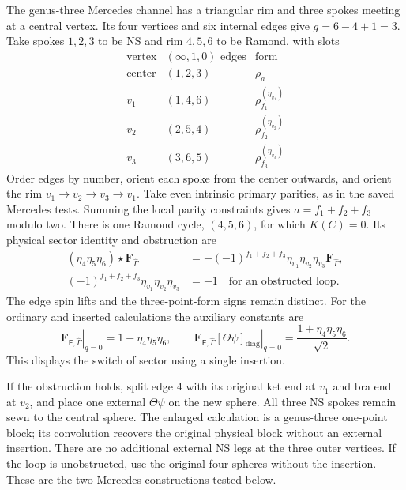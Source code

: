 \documentclass[11pt]{article}
\newcommand{\F}{\mathsf F}
\numberwithin{equation}{section}
\begin{document}
The genus-three Mercedes channel has a triangular rim and three spokes
meeting at a central vertex. Its four vertices and six internal edges
give $g=6-4+1=3$. Take spokes $1,2,3$ to be NS and rim $4,5,6$ to be
Ramond, with slots
\begin{equation}
\begin{array}{c|c|c}
\text{vertex}&(\infty,1,0)\text{ edges}&\text{form}\\ \hline
\text{center}&(1,2,3)&\rho_a\\
v_1&(1,4,6)&\rho_{f_1}^{(\eta_{v_1})}\\
v_2&(2,5,4)&\rho_{f_2}^{(\eta_{v_2})}\\
v_3&(3,6,5)&\rho_{f_3}^{(\eta_{v_3})}
\end{array}
\label{eq:mercedes-vertices}
\end{equation}
Order edges by number, orient each spoke from the center outwards, and
orient the rim $v_1\to v_2\to v_3\to v_1$. Take even intrinsic primary
parities, as in the saved Mercedes tests. Summing the local parity
constraints gives $a=f_1+f_2+f_3$ modulo two.
There is one Ramond cycle, $(4,5,6)$, for which $K(C)=0$. Its physical
sector identity and obstruction are
\begin{align}
 (\eta_4\eta_5\eta_6)\star\mathbf F_{\hat\Gamma}
   &=-(-1)^{f_1+f_2+f_3}\eta_{v_1}\eta_{v_2}\eta_{v_3}
      \mathbf F_{\hat\Gamma},
 \nonumber\\
 (-1)^{f_1+f_2+f_3}\eta_{v_1}\eta_{v_2}\eta_{v_3}&=-1
                           \quad\text{for an obstructed loop}.
 \label{eq:mercedes-obstruction}
\end{align}
The edge spin lifts and the three-point-form signs remain distinct.
For the ordinary and inserted calculations the auxiliary constants are
\begin{equation}
 \left.\mathbf F_{\F,\hat\Gamma}\right|_{q=0}
       =1-\eta_4\eta_5\eta_6,\qquad
 \left.\mathbf F_{\F,\hat\Gamma}[\Theta\psi]_{\mathrm{diag}}
                                   \right|_{q=0}
       =\frac{1+\eta_4\eta_5\eta_6}{\sqrt2}.
 \label{eq:mercedes-ground}
\end{equation}
This displays the switch of sector using a single insertion.

If the obstruction holds, split edge 4 with its original ket end at
$v_1$ and bra end at $v_2$, and place one external $\Theta\psi$ on the
new sphere. All three NS spokes remain sewn to the central sphere.
The enlarged calculation is a genus-three one-point block; its convolution
recovers the original physical block without an external insertion.
There are no additional external NS legs at the three outer vertices.
If the loop is unobstructed, use the original four spheres without the
insertion. These are the two Mercedes constructions tested below.
\end{document}
